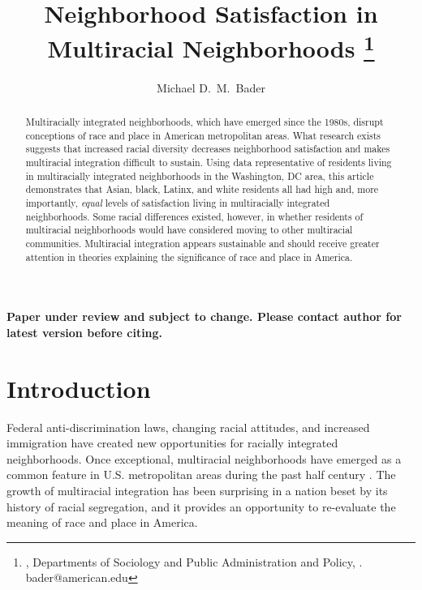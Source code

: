 \documentclass{baderart}
\title{Neighborhood Satisfaction in Multiracial Neighborhoods%
\footnote{\me, Departments of Sociology and Public Administration and Policy, \myaffiliation. bader@american.edu}%
}
\author{Michael D.\ M.\ Bader}
\begin{document}
\maketitle

\vspace{-1.5em}
\begin{center}
\textbf{Paper under review and subject to change. Please contact author for latest version before citing.}\\[1.5em]
\end{center}

\begin{abstract}
Multiracially integrated neighborhoods, which have emerged since the 1980s, disrupt conceptions of race and place in American metropolitan areas. What research exists suggests that increased racial diversity decreases neighborhood satisfaction and makes multiracial integration difficult to sustain. Using data representative of residents living in multiracially integrated neighborhoods in the Washington, DC area, this article demonstrates that Asian, black, Latinx, and white residents all had high and, more importantly, \emph{equal} levels of satisfaction living in multiracially integrated neighborhoods. Some racial differences existed, however, in whether residents of multiracial neighborhoods would have considered moving to other multiracial communities. Multiracial integration appears sustainable and should receive greater attention in theories explaining the significance of race and place in America. 

\end{abstract}

\doublespace

\section{Introduction}\label{introduction}
Federal anti-discrimination laws, changing racial attitudes, and increased immigration have created new opportunities for racially integrated neighborhoods. Once exceptional, multiracial neighborhoods have emerged as a common feature in U.S. metropolitan areas during the past half century \citep{nyden_neighborhood_1998, logan_global_2010, holloway_racially_2012}. The growth of multiracial integration has been surprising in a nation beset by its history of racial segregation, and it provides an opportunity to re-evaluate the meaning of race and place in America.
\end{document}
